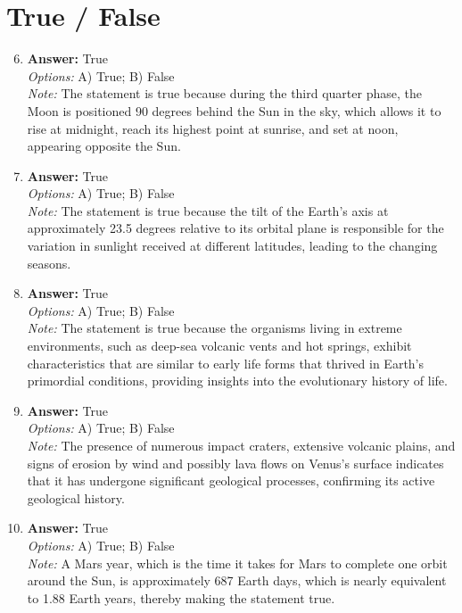 \documentclass[12pt]{article}
\begin{document}
\section*{True / False}
\begin{enumerate}[label=\arabic*.]
\setcounter{enumi}{5}
\item \textbf{Answer:} True
\\ \textit{Options:} A) True; B) False
\\ \textit{Note:} The statement is true because during the third quarter phase, the Moon is positioned 90 degrees behind the Sun in the sky, which allows it to rise at midnight, reach its highest point at sunrise, and set at noon, appearing opposite the Sun.
\item \textbf{Answer:} True
\\ \textit{Options:} A) True; B) False
\\ \textit{Note:} The statement is true because the tilt of the Earth's axis at approximately 23.5 degrees relative to its orbital plane is responsible for the variation in sunlight received at different latitudes, leading to the changing seasons.
\item \textbf{Answer:} True
\\ \textit{Options:} A) True; B) False
\\ \textit{Note:} The statement is true because the organisms living in extreme environments, such as deep-sea volcanic vents and hot springs, exhibit characteristics that are similar to early life forms that thrived in Earth's primordial conditions, providing insights into the evolutionary history of life.
\item \textbf{Answer:} True
\\ \textit{Options:} A) True; B) False
\\ \textit{Note:} The presence of numerous impact craters, extensive volcanic plains, and signs of erosion by wind and possibly lava flows on Venus's surface indicates that it has undergone significant geological processes, confirming its active geological history.
\item \textbf{Answer:} True
\\ \textit{Options:} A) True; B) False
\\ \textit{Note:} A Mars year, which is the time it takes for Mars to complete one orbit around the Sun, is approximately 687 Earth days, which is nearly equivalent to 1.88 Earth years, thereby making the statement true.
\end{enumerate}
\end{document}
